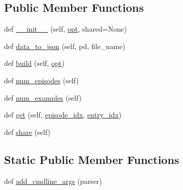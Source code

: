 \subsection*{Public Member Functions}
\begin{DoxyCompactItemize}
\item 
def \hyperlink{classparlai_1_1tasks_1_1dialogue__safety_1_1agents_1_1WikiToxicCommentsTeacher_ac9189c0fbd25d24bf036aadee0fa3aaf}{\+\_\+\+\_\+init\+\_\+\+\_\+} (self, \hyperlink{classparlai_1_1core_1_1agents_1_1Teacher_a3ce6243860ce978a897922863ed32fa4}{opt}, shared=None)
\item 
def \hyperlink{classparlai_1_1tasks_1_1dialogue__safety_1_1agents_1_1WikiToxicCommentsTeacher_ab05b135cb36558dab5a04b4b00167159}{data\+\_\+to\+\_\+json} (self, pd, file\+\_\+name)
\item 
def \hyperlink{classparlai_1_1tasks_1_1dialogue__safety_1_1agents_1_1WikiToxicCommentsTeacher_acbc5c579a2791af831f6e4f72dc8560c}{build} (self, \hyperlink{classparlai_1_1core_1_1agents_1_1Teacher_a3ce6243860ce978a897922863ed32fa4}{opt})
\item 
def \hyperlink{classparlai_1_1tasks_1_1dialogue__safety_1_1agents_1_1WikiToxicCommentsTeacher_a91737afc71227b1eb490648106b2a73c}{num\+\_\+episodes} (self)
\item 
def \hyperlink{classparlai_1_1tasks_1_1dialogue__safety_1_1agents_1_1WikiToxicCommentsTeacher_a144791f29981c18666fa8725cc424ba8}{num\+\_\+examples} (self)
\item 
def \hyperlink{classparlai_1_1tasks_1_1dialogue__safety_1_1agents_1_1WikiToxicCommentsTeacher_a036126fb8ba0cb0dcd665a5b6bd4966f}{get} (self, \hyperlink{classparlai_1_1core_1_1teachers_1_1FixedDialogTeacher_afd4ebab8063eb42d182d30a1a41f133e}{episode\+\_\+idx}, \hyperlink{classparlai_1_1core_1_1teachers_1_1FixedDialogTeacher_ae3201b15f3c3b46a2f3511bad9b43e7d}{entry\+\_\+idx})
\item 
def \hyperlink{classparlai_1_1tasks_1_1dialogue__safety_1_1agents_1_1WikiToxicCommentsTeacher_a0d73b4cda0c165161393500459440b94}{share} (self)
\end{DoxyCompactItemize}
\subsection*{Static Public Member Functions}
\begin{DoxyCompactItemize}
\item 
def \hyperlink{classparlai_1_1tasks_1_1dialogue__safety_1_1agents_1_1WikiToxicCommentsTeacher_ae852dbc08e3e60342ba52a89a6b4423c}{add\+\_\+cmdline\+\_\+args} (parser)
\end{DoxyCompactItemize}
